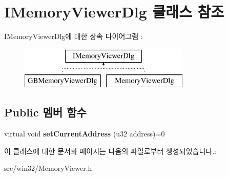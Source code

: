 \hypertarget{class_i_memory_viewer_dlg}{}\section{I\+Memory\+Viewer\+Dlg 클래스 참조}
\label{class_i_memory_viewer_dlg}
I\+Memory\+Viewer\+Dlg에 대한 상속 다이어그램 \+: \begin{figure}[H]
\begin{center}
\leavevmode
\includegraphics[height=2.000000cm]{class_i_memory_viewer_dlg}
\end{center}
\end{figure}
\subsection*{Public 멤버 함수}
\begin{DoxyCompactItemize}
\item 
\mbox{\label{class_i_memory_viewer_dlg_a95cad5a86447abbc593b7154c110bb2c}} 
virtual void {\bfseries set\+Current\+Address} (u32 address)=0
\end{DoxyCompactItemize}


이 클래스에 대한 문서화 페이지는 다음의 파일로부터 생성되었습니다.\+:\begin{DoxyCompactItemize}
\item 
src/win32/Memory\+Viewer.\+h\end{DoxyCompactItemize}
